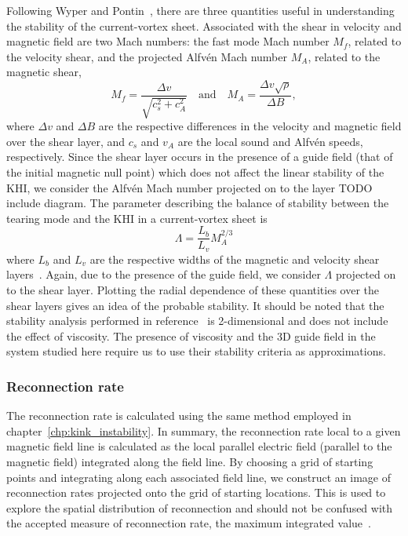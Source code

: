 Following Wyper and Pontin~\cite{wyperKelvinHelmholtzInstabilityCurrentvortex2013}, there are three quantities useful in understanding the stability of the current-vortex sheet. Associated with the shear in velocity and magnetic field are two Mach numbers: the fast mode Mach number $M_f$, related to the velocity shear, and the projected Alfv\'en Mach number $M_A$, related to the magnetic shear,
\begin{equation}
  \label{eq:mach_numbers}
  M_f = \frac{\Delta v}{\sqrt{c_s^2 + c_A^2}} \quad \text{and} \quad M_A = \frac{\Delta v \sqrt{\rho}}{\Delta B},
\end{equation}
where $\Delta v$ and $\Delta B$ are the respective differences in the velocity and magnetic field over the shear layer, and $c_s$ and $v_A$ are the local sound and Alfv\'en speeds, respectively. Since the shear layer occurs in the presence of a guide field (that of the initial magnetic null point) which does not affect the linear stability of the KHI, we consider the Alfv\'en Mach number projected on to the layer TODO include diagram. The parameter describing the balance of stability between the tearing mode and the KHI in a current-vortex sheet is
\begin{equation}
  \label{eq:khi_stability_param}
  \Lambda = \frac{L_b}{L_v} M_A^{2/3}
\end{equation}
where $L_b$ and $L_v$ are the respective widths of the magnetic and velocity shear layers~\cite{einaudiResistiveInstabilitiesFlowing1986}. Again, due to the presence of the guide field, we consider $\Lambda$ projected on to the shear layer. Plotting the radial dependence of these quantities over the shear layers gives an idea of the probable stability. It should be noted that the stability analysis performed in reference~\cite{einaudiResistiveInstabilitiesFlowing1986} is 2-dimensional and does not include the effect of viscosity. The presence of viscosity and the 3D guide field in the system studied here require us to use their stability criteria as approximations.

\subsubsection{Reconnection rate}

The reconnection rate is calculated using the same method employed in chapter~\ref{chp:kink_instability}. In summary, the reconnection rate local to a given magnetic field line is calculated as the local parallel electric field (parallel to the magnetic field) integrated along the field line. By choosing a grid of starting points and integrating along each associated field line, we construct an image of reconnection rates projected onto the grid of starting locations. This is used to explore the spatial distribution of reconnection and should not be confused with the accepted measure of reconnection rate, the maximum integrated value~\cite{galsgaardSteadyStateReconnection2011,priestNatureThreedimensionalMagnetic2003,schindlerGeneralMagneticReconnection1988}.

